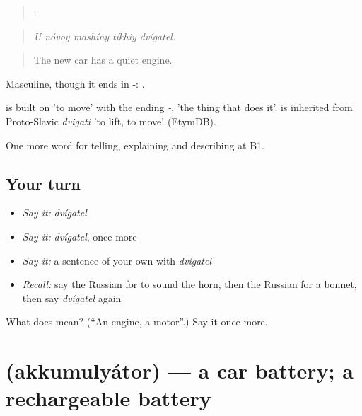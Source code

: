 \begin{quote}
    .
\end{quote}

\begin{quote}
\emph{U nóvoy mashíny tíkhiy dvígatel.}
\end{quote}

\begin{quote}
The new car has a quiet engine.
\end{quote}

Masculine, though it ends in -: \emph{ }.

\begin{cousinweb}
\emph{} is built on \emph{} 'to move' with the ending \emph{-}, 'the thing that does it'. \emph{} is inherited from Proto-Slavic \emph{dvigati} 'to lift, to move' (EtymDB).
\end{cousinweb}

\begin{grammarlens}[title={What you've built}]
One more word for telling, explaining and describing at B1.
\end{grammarlens}

\subsection*{Your turn}
\begin{itemize}
\raggedright
  \item \emph{Say it:} \emph{dvígatel}
  \item \emph{Say it:} \emph{dvígatel}, once more
  \item \emph{Say it:} a sentence of your own with \emph{dvígatel}
  \item \emph{Recall:} say the Russian for to sound the horn, then the Russian for a bonnet, then say \emph{dvígatel} again
\end{itemize}

\begin{tcolorbox}[breakable,colback=teal!4,colframe=teal!35!black,title={Before you move on}]
What does  mean? (\textquotedblleft{}An engine, a motor\textquotedblright{}.) Say it once more.
\end{tcolorbox}
\section[\texorpdfstring{\ru{аккумулятор} (akkumulyátor)}{аккумулятор (akkumulyátor)}]{ (akkumulyátor) — a car battery; a rechargeable battery}

